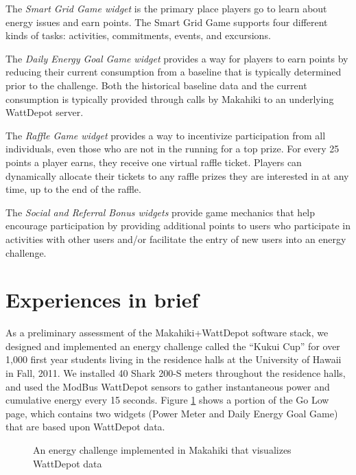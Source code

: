 \documentclass{acm_proc_article-sp}
\begin{document}
The {\em Smart Grid Game widget} is the primary place players go to learn about energy issues and earn
points.  The Smart Grid Game supports four different kinds of tasks: activities,
commitments, events, and excursions. 

The {\em Daily Energy Goal Game widget} provides a way for players to earn points by reducing their
current consumption from a baseline that is typically determined prior to the challenge.
Both the historical baseline data and the current consumption is typically provided
through calls by Makahiki to an underlying WattDepot server.


The {\em Raffle Game widget} provides a way to incentivize participation from all individuals, even
those who are not in the running for a top prize. For every 25 points a player earns, they
receive one virtual raffle ticket. Players can dynamically allocate their tickets to any
raffle prizes they are interested in at any time, up to the end of the raffle.

The {\em Social and Referral Bonus widgets} provide game mechanics that help encourage
participation by providing additional points to users who participate in activities with
other users and/or facilitate the entry of new users into an energy challenge. 

\section{Experiences in brief}

As a preliminary assessment of the Makahiki+WattDepot software stack, we designed and
implemented an energy challenge called the ``Ku\-kui Cup'' for over 1,000 first year
students living in the residence halls at the University of Hawaii in Fall, 2011.  We
installed 40 Shark 200-S meters throughout the residence halls, and used the ModBus
WattDepot sensors to gather instantaneous power and cumulative energy every 15 seconds.
Figure \ref{fig:golow} shows a portion of the Go Low page, which contains two widgets
(Power Meter and Daily Energy Goal Game) that are based upon WattDepot data.

\begin{figure}
\begin{center}
\end{center}
\caption{An energy challenge implemented in Makahiki that visualizes WattDepot data}
\label{fig:golow}
\end{figure}
\end{document}
